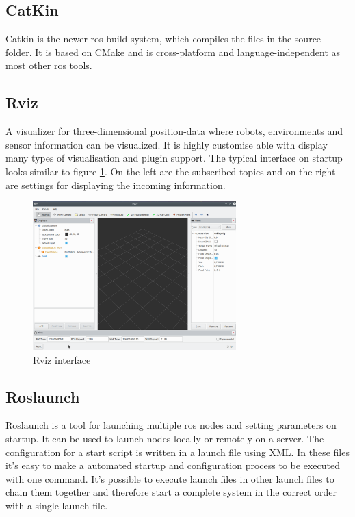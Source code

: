 \subsection{CatKin}\label{catkin}
Catkin is the newer \gls{ros} build system, which compiles the files in the source folder. It is based on CMake and is cross-platform and language-independent as most other \gls{ros} tools.

\subsection{Rviz}\label{rviz}
A visualizer for three-dimensional position-data where robots, environments and sensor information can be visualized. It is highly customise able with display many types of visualisation and plugin support. The typical interface on startup looks similar to figure \ref{rvizinterface}. On the left are the subscribed topics and on the right are settings for displaying the incoming information. \newline
\begin{figure}[h]
	\centering
	\includegraphics[width=0.7\textwidth]{./media/images/rviz}
  	\caption{Rviz interface}
  	\label{rvizinterface}
\end{figure}

\subsection{Roslaunch}\label{roslaunch}
Roslaunch is a tool for launching multiple \gls{ros} nodes and setting parameters on startup. It can be used to launch nodes locally or remotely on a server.
The configuration for a start script is written in a launch file using XML. In these files it's easy to make a automated startup and configuration process to be executed with one command. It's possible to execute launch files in other launch files to chain them together and therefore start a complete system in the correct order with a single launch file.